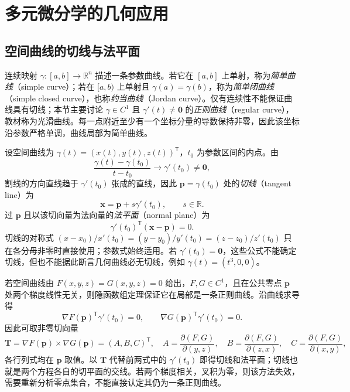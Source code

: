 \section{多元微分学的几何应用}
\label{sec:geometric-applications-of-multivariable-differentiation}


\subsection{空间曲线的切线与法平面}
\label{subsec:tangent-lines-and-normal-planes-of-space-curves}

连续映射 $\gamma:[a,b]\to\mathbb R^n$ 描述一条参数曲线。若它在 $[a,b]$ 上单射，称为\emph{简单曲线}（simple curve）；若在 $[a,b)$ 上单射且 $\gamma(a)=\gamma(b)$，称为\emph{简单闭曲线}（simple closed curve），也称\emph{约当曲线}（Jordan curve）。仅有连续性不能保证曲线具有切线；本节主要讨论 $\gamma\in C^1$ 且 $\gamma'(t)\ne\boldsymbol0$ 的\emph{正则曲线}（regular curve），教材称为光滑曲线。每一点附近至少有一个坐标分量的导数保持非零，因此该坐标沿参数严格单调，曲线局部为简单曲线。

设空间曲线为 $\gamma(t)=(x(t),y(t),z(t))^{\mathsf T}$，$t_0$ 为参数区间的内点。由
\[
    \frac{\gamma(t)-\gamma(t_0)}{t-t_0}\longrightarrow\gamma'(t_0)\ne\boldsymbol0,
\]
割线的方向直线趋于 $\gamma'(t_0)$ 张成的直线，因此 $\boldsymbol p=\gamma(t_0)$ 处的\emph{切线}（tangent line）为
\begin{equation}
\label{eq:space-curve-tangent-ch14}
    \boldsymbol x=\boldsymbol p+s\gamma'(t_0),\qquad s\in\mathbb R.
\end{equation}
过 $\boldsymbol p$ 且以该切向量为法向量的\emph{法平面}（normal plane）为
\begin{equation}
\label{eq:space-curve-normal-plane-ch14}
    \gamma'(t_0)^{\mathsf T}(\boldsymbol x-\boldsymbol p)=0.
\end{equation}
切线的对称式 $(x-x_0)/x'(t_0)=(y-y_0)/y'(t_0)=(z-z_0)/z'(t_0)$ 只在各分母非零时直接使用；参数式始终适用。若 $\gamma'(t_0)=\boldsymbol0$，这些公式不能确定切线，但也不能据此断言几何曲线必无切线，例如 $\gamma(t)=(t^3,0,0)$。

若空间曲线由 $F(x,y,z)=G(x,y,z)=0$ 给出，$F,G\in C^1$，且在公共零点 $\boldsymbol p$ 处两个梯度线性无关，则隐函数组定理保证它在局部是一条正则曲线。沿曲线求导得
\[
    \nabla F(\boldsymbol p)^{\mathsf T}\gamma'(t_0)=0,\qquad
    \nabla G(\boldsymbol p)^{\mathsf T}\gamma'(t_0)=0.
\]
因此可取非零切向量
\begin{equation}
\label{eq:implicit-curve-tangent-vector-ch14}
    \boldsymbol T=\nabla F(\boldsymbol p)\times\nabla G(\boldsymbol p)
      =(A,B,C)^{\mathsf T},\quad
    A=\frac{\partial(F,G)}{\partial(y,z)},\quad
    B=\frac{\partial(F,G)}{\partial(z,x)},\quad
    C=\frac{\partial(F,G)}{\partial(x,y)},
\end{equation}
各行列式均在 $\boldsymbol p$ 取值。以 $\boldsymbol T$ 代替前两式中的 $\gamma'(t_0)$ 即得切线和法平面；切线也就是两个方程各自的切平面的交线。若两个梯度相关，叉积为零，则该方法失效，需要重新分析零点集合，不能直接认定其仍为一条正则曲线。

